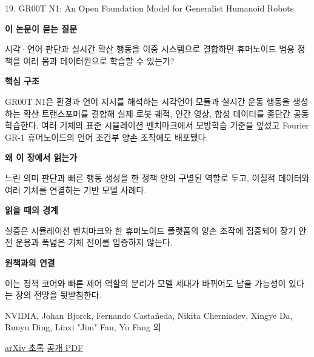 \documentclass[11pt,openany]{book}
\begin{document}
\begin{termcard}{19. GR00T N1: An Open Foundation Model for Generalist Humanoid Robots}

\par

\medskip

{\sffamily\bfseries\color{deepblue} 이 논문이 묻는 질문}\par

시각·언어 판단과 실시간 확산 행동을 이중 시스템으로 결합하면 휴머노이드 범용 정책을 여러 몸과 데이터원으로 학습할 수 있는가?

\smallskip

{\sffamily\bfseries\color{deepblue} 핵심 구조}\par

GR00T N1은 환경과 언어 지시를 해석하는 시각언어 모듈과 실시간 운동 행동을 생성하는 확산 트랜스포머를 결합해 실제 로봇 궤적, 인간 영상, 합성 데이터를 종단간 공동 학습한다. 여러 기체의 표준 시뮬레이션 벤치마크에서 모방학습 기준을 앞섰고 Fourier GR-1 휴머노이드의 언어 조건부 양손 조작에도 배포됐다.

\smallskip

{\sffamily\bfseries\color{deepblue} 왜 이 장에서 읽는가}\par

느린 의미 판단과 빠른 행동 생성을 한 정책 안의 구별된 역할로 두고, 이질적 데이터와 여러 기체를 연결하는 기반 모델 사례다.

\smallskip

{\sffamily\bfseries\color{coral} 읽을 때의 경계}\par

실증은 시뮬레이션 벤치마크와 한 휴머노이드 플랫폼의 양손 조작에 집중되어 장기 안전 운용과 폭넓은 기체 전이를 입증하지 않는다.

\smallskip

{\sffamily\bfseries\color{teal} 원책과의 연결}\par

이는 정책 코어와 빠른 제어 역할의 분리가 모델 세대가 바뀌어도 남을 가능성이 있다는 장의 전망을 뒷받침한다.

\medskip

{\footnotesize\color{muted} NVIDIA, Johan Bjorck, Fernando Castañeda, Nikita Cherniadev, Xingye Da, Runyu Ding, Linxi "Jim" Fan, Yu Fang 외\par

\href{https://arxiv.org/abs/2503.14734}{arXiv 초록} \quad \href{https://arxiv.org/pdf/2503.14734}{공개 PDF}\par}

\end{termcard}
\end{document}
